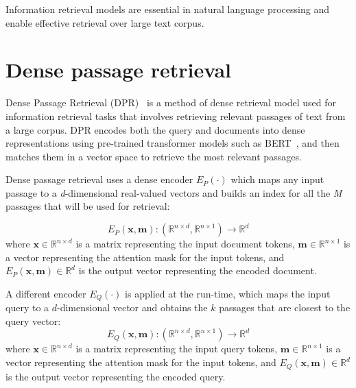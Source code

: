 Information retrieval models are essential in natural language processing and enable effective retrieval over large text corpus.


\section{Dense passage retrieval}
Dense Passage Retrieval (DPR)~\cite{DPR} is a method of dense retrieval model used for information retrieval tasks that involves retrieving relevant passages of text from a large corpus. DPR encodes both the query and documents into dense representations using pre-trained transformer models such as BERT~\cite{bert}, and then matches them in a vector space to retrieve the most relevant passages.

Dense passage retrieval uses a dense encoder $E_P(\cdot)$ which maps any input passage to a \emph{d}-dimensional real-valued vectors and builds an index for all the \emph{M} passages that will be used for retrieval:

\begin{equation}
    E_P(\mathbf{x}, \mathbf{m}) : (\mathbb{R}^{n \times d}, \mathbb{R}^{n \times 1}) \rightarrow \mathbb{R}^d
\end{equation}
where $\mathbf{x} \in \mathbb{R}^{n \times d}$ is a matrix representing the input document tokens, $\mathbf{m} \in \mathbb{R}^{n \times 1}$ is a vector representing the attention mask for the input tokens, and $E_P(\mathbf{x}, \mathbf{m}) \in \mathbb{R}^d$ is the output vector representing the encoded document.

A different encoder $E_Q(\cdot)$ is applied at the run-time, which maps the input query to a $d$-dimensional vector and obtains the $k$ passages that are closest to the query vector:
\begin{equation}
    E_Q(\mathbf{x}, \mathbf{m}) : (\mathbb{R}^{n \times d}, \mathbb{R}^{n \times 1}) \rightarrow \mathbb{R}^d
\end{equation}
where $\mathbf{x} \in \mathbb{R}^{n \times d}$ is a matrix representing the input query tokens, $\mathbf{m} \in \mathbb{R}^{n \times 1}$ is a vector representing the attention mask for the input tokens, and $E_Q(\mathbf{x}, \mathbf{m}) \in \mathbb{R}^d$ is the output vector representing the encoded query.

